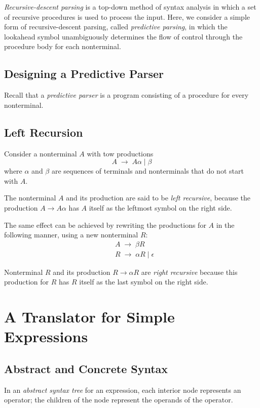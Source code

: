 \documentclass[a4paper,twoside]{book}
\begin{document}
\textit{Recursive-descent parsing} is a top-down method of syntax analysis in which a set of recursive procedures is used to process the input. Here, we consider a simple form of recursive-descent parsing, called \textit{predictive parsing}, in which the lookahead symbol unambiguously determines the flow of control through the procedure body for each nonterminal.

\subsection{Designing a Predictive Parser}

Recall that a \textit{predictive parser} is a program consisting of a procedure for every nonterminal.

\subsection{Left Recursion}

Consider a nonterminal $A$ with tow productions $$A\;\rightarrow\;A\alpha\;|\;\beta$$ where $\alpha$ and $\beta$ are sequences of terminals and nonterminals that do not start with $A$.

The nonterminal $A$ and its production are said to be \textit{left recursive}, because the production $A\to A\alpha$ has $A$ itself as the leftmost symbol on the right side.

The same effect can be achieved by rewriting the productions for $A$ in the following manner, using a new nonterminal $R$:
\begin{align*}
    &A\;\to\;\beta R\\
    &R\;\to\;\alpha R\;|\;\epsilon
\end{align*}

Nonterminal $R$ and its production $R\to\alpha R$ are \textit{right recursive} because this production for $R$ has $R$ itself as the last symbol on the right side.

\section{A Translator for Simple Expressions}

\subsection{Abstract and Concrete Syntax}

In an \textit{abstract syntax tree} for an expression, each interior node represents an operator; the children of the node represent the operands of the operator.
\end{document}

